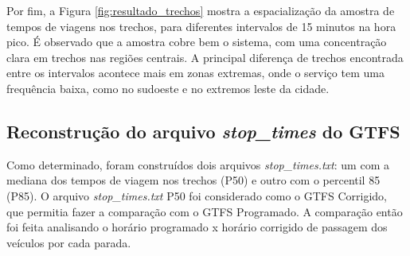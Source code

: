 \documentclass[        
    a4paper,          %
    12pt,             %
    chapter=TITLE,    %
    section=Title,    %
    subsection=Title, %
    oneside,          %
    english,          %
    spanish,          %
    brazil,           %
    fleqn             %
]{abntex2}
\begin{document}
  Por fim, a Figura \ref{fig:resultado_trechos} mostra a espacialização da amostra de tempos de viagens nos trechos, para diferentes intervalos de 15 minutos na hora pico. É observado que a amostra cobre bem o sistema, com uma concentração clara em trechos nas regiões centrais. A principal diferença de trechos encontrada entre os intervalos acontece mais em zonas extremas, onde o serviço tem uma frequência baixa, como no sudoeste e no extremos leste da cidade.
  
  \begin{figure}[!h]
  \captionsetup{width=16cm}
  \centering
  \end{figure}
  
  \hypertarget{reconstrucao-do-arquivo-stop_times-do-gtfs}{%
  \subsection{\texorpdfstring{Reconstrução do arquivo \emph{stop\_times} do GTFS}{Reconstrução do arquivo stop\_times do GTFS}}\label{reconstrucao-do-arquivo-stop_times-do-gtfs}}
  
  Como determinado, foram construídos dois arquivos \emph{stop\_times.txt}: um com a mediana dos tempos de viagem nos trechos (P50) e outro com o percentil 85 (P85). O arquivo \emph{stop\_times.txt} P50 foi considerado como o GTFS Corrigido, que permitia fazer a comparação com o GTFS Programado. A comparação então foi feita analisando o horário programado x horário corrigido de passagem dos veículos por cada parada.
  
\end{document}
